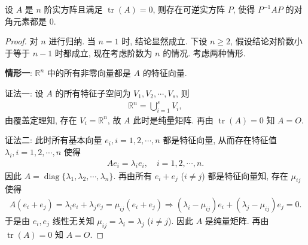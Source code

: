 \documentclass[../../main.tex]{subfiles}%
\begin{document}
\begin{proposition}\label{proposition:迹0阵必相似于主对角全0阵}
设 $A$ 是 $n$ 阶实方阵且满足 $\operatorname{tr}(A)=0$, 则存在可逆实方阵 $P$, 使得 $P^{-1}AP$ 的对角元素都是 $0$.
\end{proposition}
\begin{proof}

对 $n$ 进行归纳. 当 $n=1$ 时, 结论显然成立. 下设 $n\geqslant 2$, 假设结论对阶数小于等于 $n-1$ 时都成立, 现在考虑阶数为 $n$ 的情况. 考虑两种情形.

\textbf{情形一}: $\mathbb{R}^n$ 中的所有非零向量都是 $A$ 的特征向量.

{\color{blue}证法一:} 设 $A$ 的所有特征子空间为 $V_1,V_2,\cdots,V_s$, 则
\begin{align*}
\mathbb{R}^n = \bigcup_{i=1}^s V_i,
\end{align*}
由覆盖定理知, 存在 $V_i=\mathbb{R}^n$, 故 $A$ 此时是纯量矩阵. 再由 $\operatorname{tr}(A)=0$ 知 $A=O$.

{\color{blue}证法二:} 此时所有基本向量 $e_i,i=1,2,\cdots,n$ 都是特征向量, 从而存在特征值 $\lambda_i,i=1,2,\cdots,n$ 使得
\begin{align*}
Ae_i = \lambda_i e_i,\quad i=1,2,\cdots,n.
\end{align*}
因此 $A=\operatorname{diag}\{\lambda_1,\lambda_2,\cdots,\lambda_n\}$. 再由所有 $e_i+e_j$ ($i\ne j$) 都是特征向量知, 存在 $\mu_{ij}$ 使得
\begin{align*}
A(e_i+e_j) = \lambda_i e_i + \lambda_j e_j = \mu_{ij}(e_i+e_j)
\Longrightarrow (\lambda_i-\mu_{ij})e_i + (\lambda_j-\mu_{ij})e_j = 0.
\end{align*}
于是由 $e_i,e_j$ 线性无关知 $\mu_{ij}=\lambda_i=\lambda_j$ ($i\ne j$). 因此 $A$ 是纯量矩阵. 再由 $\operatorname{tr}(A)=0$ 知 $A=O$.


\end{proof}
\end{document}
